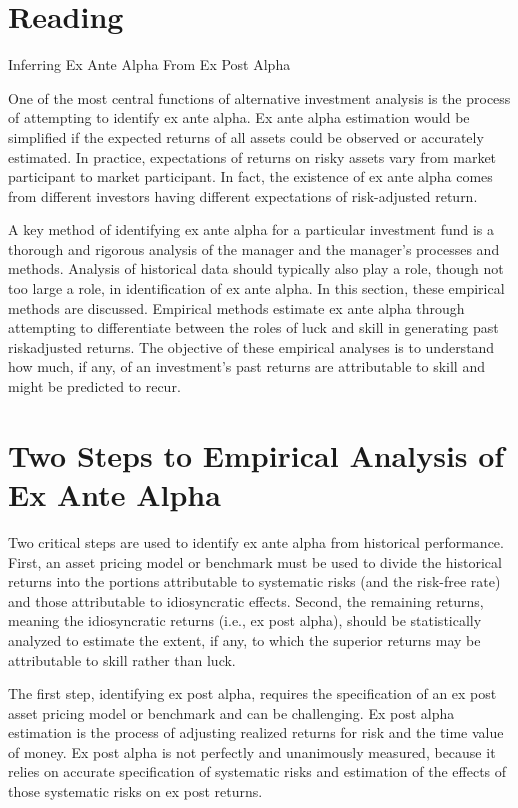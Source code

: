 \documentclass[11pt]{article}
\begin{document}
\section*{Reading}
Inferring Ex Ante Alpha From Ex Post Alpha

One of the most central functions of alternative investment analysis is the process of attempting to identify ex ante alpha. Ex ante alpha estimation would be simplified if the expected returns of all assets could be observed or accurately estimated. In practice, expectations of returns on risky assets vary from market participant to market participant. In fact, the existence of ex ante alpha comes from different investors having different expectations of risk-adjusted return.

A key method of identifying ex ante alpha for a particular investment fund is a thorough and rigorous analysis of the manager and the manager's processes and methods. Analysis of historical data should typically also play a role, though not too large a role, in identification of ex ante alpha. In this section, these empirical methods are discussed. Empirical methods estimate ex ante alpha through attempting to differentiate between the roles of luck and skill in generating past riskadjusted returns. The objective of these empirical analyses is to understand how much, if any, of an investment's past returns are attributable to skill and might be predicted to recur.

\section*{Two Steps to Empirical Analysis of Ex Ante Alpha}
Two critical steps are used to identify ex ante alpha from historical performance. First, an asset pricing model or benchmark must be used to divide the historical returns into the portions attributable to systematic risks (and the risk-free rate) and those attributable to idiosyncratic effects. Second, the remaining returns, meaning the idiosyncratic returns (i.e., ex post alpha), should be statistically analyzed to estimate the extent, if any, to which the superior returns may be attributable to skill rather than luck.

The first step, identifying ex post alpha, requires the specification of an ex post asset pricing model or benchmark and can be challenging. Ex post alpha estimation is the process of adjusting realized returns for risk and the time value of money. Ex post alpha is not perfectly and unanimously measured, because it relies on accurate specification of systematic risks and estimation of the effects of those systematic risks on ex post returns.
\end{document}
